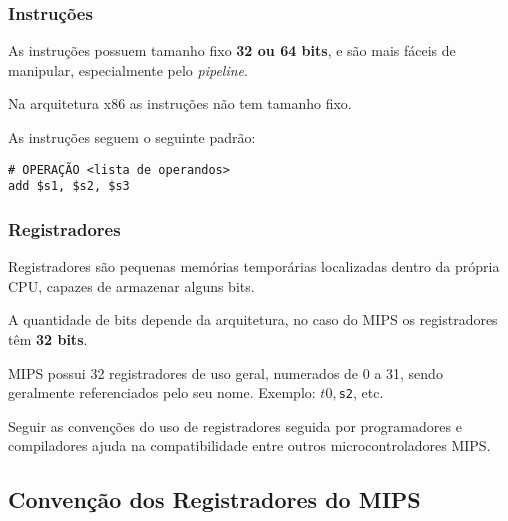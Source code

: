 \documentclass{article}
\begin{document}
\subsubsection{Instruções}
As instruções possuem tamanho fixo \textbf{32 ou 64 bits}, e são mais fáceis de manipular, especialmente pelo \textit{pipeline}.

\begin{tcolorbox}[colback=orange!10, colframe=orange!80, title=Interessante, fonttitle=\bfseries]
    Na arquitetura x86 as instruções não tem tamanho fixo.
\end{tcolorbox}

As instruções seguem o seguinte padrão:

\begin{verbatim}
# OPERAÇÃO <lista de operandos>
add $s1, $s2, $s3    
\end{verbatim}

\subsubsection{Registradores}
Registradores são pequenas memórias temporárias localizadas dentro da 
própria CPU, capazes de armazenar alguns bits.

A quantidade de bits depende da arquitetura, no caso do MIPS os registradores têm \textbf{32 bits}. 

MIPS possui 32 registradores de uso geral, numerados de 0 a 31, sendo geralmente referenciados pelo seu nome. Exemplo: \texttt{$t0, $s2}, etc.

Seguir as convenções do uso de registradores seguida por programadores e
compiladores ajuda na compatibilidade entre outros microcontroladores MIPS.

\clearpage

\subsection{Convenção dos Registradores do MIPS}
\end{document}
